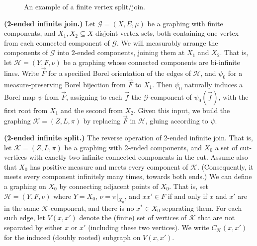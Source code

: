 \documentclass{article}
\theoremstyle{plain}
\theoremstyle{definition}
\newcommand{\cG}{\mathcal{G}}
\newcommand{\cH}{\mathcal{H}}
\newcommand{\cK}{\mathcal{K}}
\begin{document}
\begin{figure}[htb]
{
}
\caption{An example of a finite vertex split/join.\label{Fig:finite_split}}
\end{figure}
    
{\bf (2-ended infinite join.)} Let $\cG=(X,E,\mu)$ be a graphing with finite components, and $X_1,X_2 \subseteq X$ disjoint vertex sets, both containing one vertex from each connected component of $\cG$. We will measurably arrange the components of $\cG$ into $2$-ended components, joining them at $X_1$ and $X_2$. That is, let $\cH=(Y, F, \nu)$ be a graphing whose connected components are bi-infinite lines. Write $\vec{F}$ for a specified Borel orientation of the edges of $\cH$, and $\psi_0$ for a measure-preserving Borel bijection from $\vec{F}$ to $X_1$. Then $\psi_0$ naturally induces a Borel map $\psi$ from $\vec{F}$, assigning to each $\vec{f}$ the $\cG$-component of $\psi_0(\vec{f})$, with the first root from $X_1$ and the second from $X_2$. Given this input, we build the graphing $\mathcal{K}=(Z, L, \pi)$ by replacing $\vec{F}$ in $\cH$, gluing according to $\psi$.


{\bf (2-ended infinite split.)} The reverse operation of $2$-ended infinite join. That is, let $\mathcal{K}=(Z, L, \pi)$ be a graphing with 2-ended components, and $X_0$ a set of cut-vertices with exactly two infinite connected components in the cut. Assume also that $X_0$ has positive measure and meets every component of $\cK$. (Consequently, it meets every component infinitely many times, towards both ends.) We can define a graphing on $X_0$ by connecting adjacent points of $X_0$. That is, set $\cH=(Y,F,\nu)$ where $Y=X_0$, $\nu=\pi|_{X_0}$, and $xx' \in F$ if and only if $x$ and $x'$ are in the same $\mathcal{K}$-component, and there is no $x^* \in X_0$ separating them. For each such edge, let $V(x,x')$ denote the (finite) set of vertices of $\mathcal{K}$ that are not separated by either $x$ or $x'$ (including these two vertices). We write $C_{\mathcal{K}}(x,x')$ for the induced (doubly rooted) subgraph on $V(x,x')$. 
\end{document}
